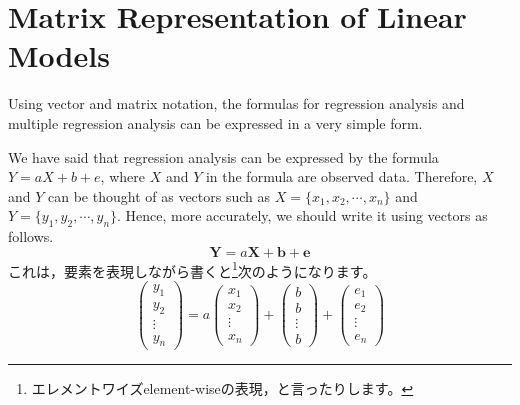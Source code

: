 \documentclass{ltjsbook}
\begin{document}
\section{Matrix Representation of Linear Models}
Using vector and matrix notation, the formulas for regression analysis and multiple regression analysis can be expressed in a very simple form.

We have said that regression analysis can be expressed by the formula $Y=aX+b+e$, where $X$ and $Y$ in the formula are observed data. Therefore, $X$ and $Y$ can be thought of as vectors such as $X=\{x_1,x_2,\cdots,x_n\}$ and $Y=\{y_1,y_2,\cdots,y_n\}$. Hence, more accurately, we should write it using vectors as follows.
\[ \bm{Y} = a\bm{X} + \bm{b} + \bm{e}\]
これは，要素を表現しながら書くと\footnote{エレメントワイズelement-wiseの表現，と言ったりします。}次のようになります。
\[
	\begin{pmatrix}
		y_1    \\
		y_2    \\
		\vdots \\
		y_n
	\end{pmatrix}
	=a
	\begin{pmatrix}
		x_1    \\
		x_2    \\
		\vdots \\
		x_n
	\end{pmatrix}
	+
	\begin{pmatrix}
		b      \\
		b      \\
		\vdots \\
		b
	\end{pmatrix}
	+
	\begin{pmatrix}
		e_1    \\
		e_2    \\
		\vdots \\
		e_n
	\end{pmatrix}
\]
\end{document}
